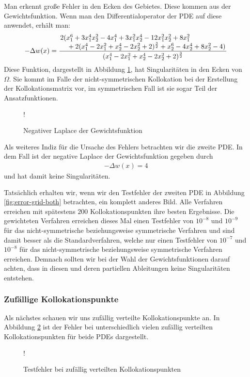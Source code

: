 Man erkennt große Fehler in den Ecken des Gebietes. Diese kommen aus der Gewichtsfunktion. Wenn man den Differentialoperator der \ac{PDE} auf diese anwendet, erhält man:
\begin{align*}
-\Delta w(x) = \frac{\splitfrac{ 2(x_1^6+3x_1^4x_2^2-4x_1^4+3x_1^2x_2^4-12x_1^2x_2^2+8x_1^2}{+2(x_1^4-2x_1^2+x_2^4-2x_2^2+2)^{\frac{3}{2}}+x_2^6-4x_2^4+8x_2^2-4)}}{(x_1^4-2x_1^2+x_2^4-2x_2^2+2)^{\frac{3}{2}}}
\end{align*}
Diese Funktion, dargestellt in Abbildung \ref{fig:Gewicht}, hat Singularitäten in den Ecken von $\Omega$. Sie kommt im Falle der nicht-symmetrischen Kollokation bei der Erstellung der Kollokationsmatrix vor, im symmetrischen Fall ist sie sogar Teil der Ansatzfunktionen.
\begin{figure}[H]
\centering
\resizebox {.7\columnwidth} {!} {

}
\caption{Negativer Laplace der Gewichtsfunktion}
\label{fig:Gewicht}
\end{figure}
Als weiteres Indiz für die Ursache des Fehlers betrachten wir die zweite \ac{PDE}. In dem Fall ist der negative Laplace der Gewichtsfunktion gegeben durch
\begin{align*}
- \Delta w(x) = 4
\end{align*}
und hat damit keine Singularitäten.

Tatsächlich erhalten wir, wenn wir den Testfehler der zweiten \ac{PDE} in Abbildung \ref{fig:error-grid-both} betrachten, ein komplett anderes Bild. Alle Verfahren erreichen mit spätestens $200$ Kollokationspunkten ihre besten Ergebnisse. Die gewichteten Verfahren erreichen dieses Mal einen Testfehler von $10^{-8}$ und $10^{-9}$ für das nicht-symmetrische beziehungsweise symmetrische Verfahren und sind damit besser als die Standardverfahren, welche nur einen Testfehler von $10^{-7}$ und $10^{-8}$ für das nicht-symmetrische beziehungsweise symmetrische Verfahren erreichen. Demnach sollten wir bei der Wahl der Gewichtsfunktionen darauf achten, dass in diesen und deren partiellen Ableitungen keine Singularitäten entstehen.

\subsubsection{Zufällige Kollokationspunkte}
Als nächstes schauen wir uns zufällig verteilte Kollokationspunkte an. In Abbildung \ref{fig:error-random} ist der Fehler bei unterschiedlich vielen zufällig verteilten Kollokationspunkten für beide \acp{PDE} dargestellt.
\begin{figure}[ht]
\centering
\resizebox {\columnwidth} {!} {

}
\caption{Testfehler bei zufällig verteilten Kollokationspunkten}
\label{fig:error-random}
\end{figure}

